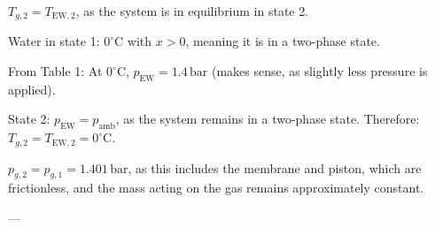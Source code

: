 \( T_{g,2} = T_{\text{EW},2} \), as the system is in equilibrium in state 2.  

Water in state 1: \( 0^\circ \text{C} \) with \( x > 0 \), meaning it is in a two-phase state.  

From Table 1:  
At \( 0^\circ \text{C} \), \( p_{\text{EW}} = 1.4 \, \text{bar} \) (makes sense, as slightly less pressure is applied).  

State 2: \( p_{\text{EW}} = p_{\text{amb}} \), as the system remains in a two-phase state. Therefore:  
\( T_{g,2} = T_{\text{EW},2} = 0^\circ \text{C} \).  

\( p_{g,2} = p_{g,1} = 1.401 \, \text{bar} \), as this includes the membrane and piston, which are frictionless, and the mass acting on the gas remains approximately constant.  

---